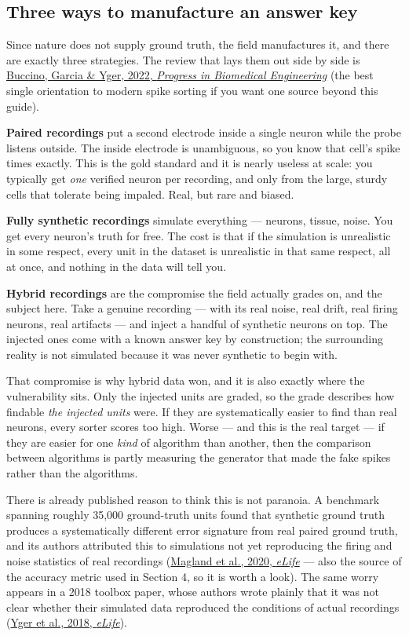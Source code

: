 \documentclass[12pt]{article}
\begin{document}
\subsection{Three ways to manufacture an answer key}

Since nature does not supply ground truth, the field manufactures it, and there are exactly
three strategies. The review that lays them out side by side is
\href{https://doi.org/10.1088/2516-1091/ac6b96}{Buccino, Garcia \& Yger, 2022,
\emph{Progress in Biomedical Engineering}} (the best single orientation to modern spike
sorting if you want one source beyond this guide).

\textbf{Paired recordings} put a second electrode inside a single neuron while the probe
listens outside. The inside electrode is unambiguous, so you know that cell's spike times
exactly. This is the gold standard and it is nearly useless at scale: you typically get
\emph{one} verified neuron per recording, and only from the large, sturdy cells that
tolerate being impaled. Real, but rare and biased.

\textbf{Fully synthetic recordings} simulate everything --- neurons, tissue, noise. You get
every neuron's truth for free. The cost is that if the simulation is unrealistic in some
respect, every unit in the dataset is unrealistic in that same respect, all at once, and
nothing in the data will tell you.

\textbf{Hybrid recordings} are the compromise the field actually grades on, and the subject
here. Take a genuine recording --- with its real noise, real drift, real firing neurons,
real artifacts --- and inject a handful of synthetic neurons on top. The injected ones come
with a known answer key by construction; the surrounding reality is not simulated because it
was never synthetic to begin with.

That compromise is why hybrid data won, and it is also exactly where the vulnerability sits.
Only the injected units are graded, so the grade describes how findable \emph{the injected
units} were. If they are systematically easier to find than real neurons, every sorter
scores too high. Worse --- and this is the real target --- if they are easier for one
\emph{kind} of algorithm than another, then the comparison between algorithms is partly
measuring the generator that made the fake spikes rather than the algorithms.

There is already published reason to think this is not paranoia. A benchmark spanning
roughly 35,000 ground-truth units found that synthetic ground truth produces a
systematically different error signature from real paired ground truth, and its authors
attributed this to simulations not yet reproducing the firing and noise statistics of real
recordings (\href{https://doi.org/10.7554/eLife.55167}{Magland et al., 2020, \emph{eLife}}
--- also the source of the accuracy metric used in Section 4, so it is worth a look). The
same worry appears in a 2018 toolbox paper, whose authors wrote plainly that it was not
clear whether their simulated data reproduced the conditions of actual recordings
(\href{https://doi.org/10.7554/eLife.34518}{Yger et al., 2018, \emph{eLife}}).
\end{document}
